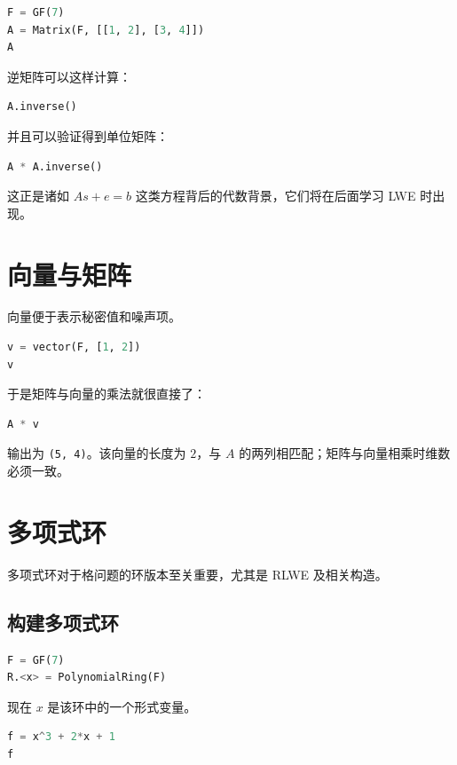 \begin{lstlisting}[language=Python]
F = GF(7)
A = Matrix(F, [[1, 2], [3, 4]])
A
\end{lstlisting}

逆矩阵可以这样计算：

\begin{lstlisting}[language=Python]
A.inverse()
\end{lstlisting}

并且可以验证得到单位矩阵：

\begin{lstlisting}[language=Python]
A * A.inverse()
\end{lstlisting}

这正是诸如 $A s + e = b$ 这类方程背后的代数背景，它们将在后面学习 LWE 时出现。

\section{向量与矩阵}
向量便于表示秘密值和噪声项。

\begin{lstlisting}[language=Python]
v = vector(F, [1, 2])
v
\end{lstlisting}

于是矩阵与向量的乘法就很直接了：

\begin{lstlisting}[language=Python]
A * v
\end{lstlisting}

输出为 \texttt{(5, 4)}。该向量的长度为 $2$，与 $A$ 的两列相匹配；矩阵与向量相乘时维数必须一致。

\section{多项式环}
多项式环对于格问题的环版本至关重要，尤其是 RLWE 及相关构造。

\subsection{构建多项式环}

\begin{lstlisting}[language=Python]
F = GF(7)
R.<x> = PolynomialRing(F)
\end{lstlisting}

现在 $x$ 是该环中的一个形式变量。

\begin{lstlisting}[language=Python]
f = x^3 + 2*x + 1
f
\end{lstlisting}

